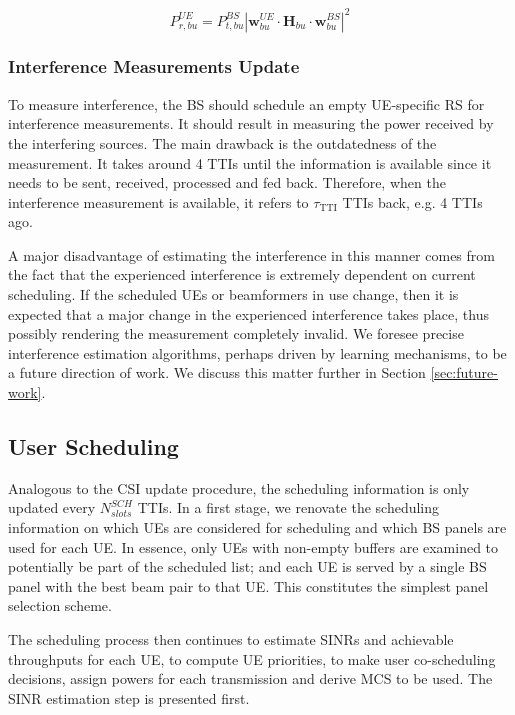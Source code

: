\begin{equation} \label{eq:rx_pow_ue}
    P_{r, bu}^{UE} = P_{t, bu}^{BS} \left| \bm{w}^{UE}_{bu} \cdot \bm{H}_{bu} \cdot \bm{w}^{BS}_{bu} \right|^2 
\end{equation}


\subsubsection*{Interference Measurements Update}

To measure interference, the \ac{BS} should schedule an empty UE-specific \acs{RS} for interference measurements. It should result in measuring the power received by the interfering sources. The main drawback is the outdatedness of the measurement. It takes around 4 TTIs until the information is available since it needs to be sent, received, processed and fed back. Therefore, when the interference measurement is available, it refers to $\tau_\text{TTI}$ TTIs back, e.g. 4 TTIs ago. 

A major disadvantage of estimating the interference in this manner comes from the fact that the experienced interference is extremely dependent on current scheduling. If the scheduled UEs or beamformers in use change, then it is expected that a major change in the experienced interference takes place, thus possibly rendering the measurement completely invalid. We foresee precise interference estimation algorithms, perhaps driven by learning mechanisms, to be a future direction of work. We discuss this matter further in Section \ref{sec:future-work}. 


\subsection{User Scheduling}

Analogous to the CSI update procedure, the scheduling information is only updated every $N^{SCH}_{slots}$ TTIs. In a first stage, we renovate the scheduling information on which UEs are considered for scheduling and which BS panels are used for each UE. In essence, only UEs with non-empty buffers are examined to potentially be part of the scheduled list; and each UE is served by a single BS panel with the best beam pair to that UE. This constitutes the simplest panel selection scheme. 

The scheduling process then continues to estimate SINRs and achievable throughputs for each UE, to compute UE priorities, to make user co-scheduling decisions, assign powers for each transmission and derive MCS to be used. The SINR estimation step is presented first.

